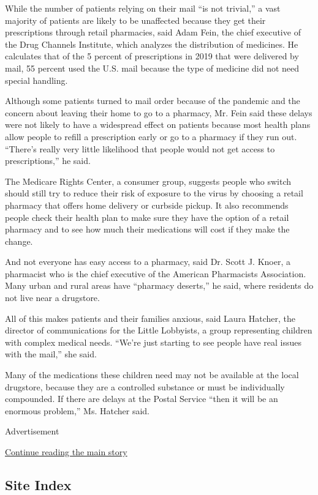 While the number of patients relying on their mail ``is not trivial,'' a
vast majority of patients are likely to be unaffected because they get
their prescriptions through retail pharmacies, said Adam Fein, the chief
executive of the Drug Channels Institute, which analyzes the
distribution of medicines. He calculates that of the 5 percent of
prescriptions in 2019 that were delivered by mail, 55 percent used the
U.S. mail because the type of medicine did not need special handling.

Although some patients turned to mail order because of the pandemic and
the concern about leaving their home to go to a pharmacy, Mr. Fein said
these delays were not likely to have a widespread effect on patients
because most health plans allow people to refill a prescription early or
go to a pharmacy if they run out. ``There's really very little
likelihood that people would not get access to prescriptions,'' he said.

The Medicare Rights Center, a consumer group, suggests people who switch
should still try to reduce their risk of exposure to the virus by
choosing a retail pharmacy that offers home delivery or curbside pickup.
It also recommends people check their health plan to make sure they have
the option of a retail pharmacy and to see how much their medications
will cost if they make the change.

And not everyone has easy access to a pharmacy, said Dr. Scott J. Knoer,
a pharmacist who is the chief executive of the American Pharmacists
Association. Many urban and rural areas have ``pharmacy deserts,'' he
said, where residents do not live near a drugstore.

All of this makes patients and their families anxious, said Laura
Hatcher, the director of communications for the Little Lobbyists, a
group representing children with complex medical needs. ``We're just
starting to see people have real issues with the mail,'' she said.

Many of the medications these children need may not be available at the
local drugstore, because they are a controlled substance or must be
individually compounded. If there are delays at the Postal Service
``then it will be an enormous problem,'' Ms. Hatcher said.

Advertisement

\protect\hyperlink{after-bottom}{Continue reading the main story}

\hypertarget{site-index}{%
\subsection{Site Index}\label{site-index}}

